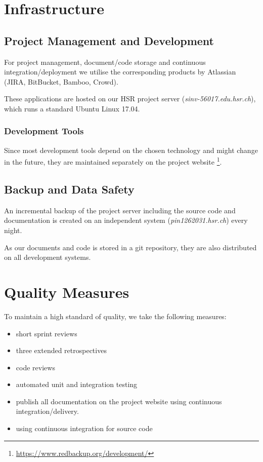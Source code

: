 \chapter{Infrastructure}


\section{Project Management and Development}

For project management, document/code storage and continuous integration/deployment we utilise the corresponding products by Atlassian (JIRA, BitBucket, Bamboo, Crowd)\cite{atlassian-opensource}.

These applications are hosted on our HSR project server (\textit{sinv-56017.edu.hsr.ch}), which runs a standard Ubuntu Linux 17.04.


\subsection{Development Tools}

Since most development tools depend on the chosen technology and might change in the future, they are maintained separately on the project website \footnote{\url{https://www.redbackup.org/development/}}.

\section{Backup and Data Safety}

An incremental backup of the project server including the source code and documentation is created on an independent system (\textit{pin1262031.hsr.ch}) every night.

As our documents and code is stored in a git repository, they are also distributed on all development systems.


\chapter{Quality Measures}
To maintain a high standard of quality, we take the following measures:

\begin{multicols}{2}
	\begin{itemize}
	    \item short sprint reviews
	    \item three extended retrospectives
	    \item code reviews
	    \item automated unit and integration testing
	    \item publish all documentation on the project website using continuous integration/delivery.
	    \item using continuous integration for source code
	\end{itemize}
\end{multicols}

